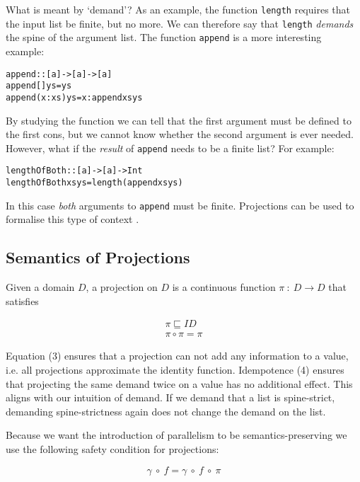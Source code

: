 What is meant by `demand'? As an example, the function \verb'length' requires
that the input list be finite, but no more. We can therefore say that
\verb'length' \emph{demands} the spine of the argument list. The function
\verb'append' is a more interesting example:

\begin{alltt}
        append :: [a] -> [a] -> [a]
        append []     ys = ys
        append (x:xs) ys = x : append xs ys
\end{alltt}

By studying the function we can tell that the first argument must be defined to
the first cons, but we cannot know whether the second argument is ever needed. However, what
if the \emph{result} of \verb'append' needs to be a finite list? For example:

\begin{alltt}

    lengthOfBoth :: [a] -> [a] -> Int
    lengthOfBoth xs ys = length (append xs ys)
\end{alltt}

In this case \emph{both} arguments to \verb'append' must be finite. Projections
can be used to formalise this type of context \citep{wadler1987projections,
hinze1995projection}.

\subsection{Semantics of Projections}

Given a domain $D$, a projection on $D$ is a continuous function
$\pi \ : \ D \rightarrow D$ that satisfies

\begin{align}
\pi \sqsubseteq ID \\
\pi \circ \pi = \pi
\end{align}

Equation (3) ensures that a projection can not add any information to a value,
i.e. all projections approximate the identity function. Idempotence (4) ensures
that projecting the same demand twice on a value has no additional effect. This
aligns with our intuition of demand. If we demand that a list is spine-strict,
demanding spine-strictness again does not change the demand on the list.

Because we want the introduction of parallelism to be semantics-preserving we
use the following safety condition for projections:

\begin{equation}
\gamma \ \circ \ f = \gamma \ \circ \ f \ \circ \ \pi
\end{equation}

